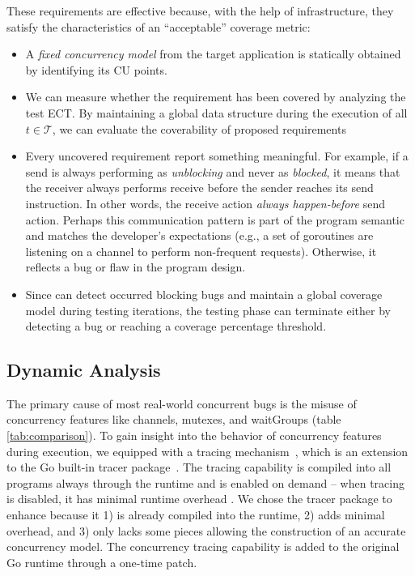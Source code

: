 These requirements are effective because, with the help of \goat infrastructure, they satisfy the characteristics of an ``acceptable'' coverage metric:
\begin{itemize}
  \item A \textit{fixed concurrency model} from the target application is statically obtained by identifying its CU points.
  \item We can measure whether the requirement has been covered by analyzing the test ECT. By maintaining a global data structure during the execution of all $t \in \mathcal{T}$, we can evaluate the coverability of proposed requirements
  \item Every uncovered requirement report something meaningful. For example, if a send is always performing as \textit{unblocking} and never as \textit{blocked}, it means that the receiver always performs receive before the sender reaches its send instruction. In other words, the receive action \textit{always happen-before} send action. Perhaps this communication pattern is part of the program semantic and matches the developer's expectations (e.g., a set of goroutines are listening on a channel to perform non-frequent requests). Otherwise, it reflects a bug or flaw in the program design.
  \item Since \goat can detect occurred blocking bugs and maintain a global coverage model during testing iterations, the testing phase can terminate either by detecting a bug or reaching a coverage percentage threshold.
\end{itemize}


\subsection{Dynamic Analysis}
\label{sec:dynamic_analysis}
The primary cause of most real-world concurrent bugs is the misuse of concurrency features like channels, mutexes, and waitGroups (table \ref{tab:comparison}).
%
To gain insight into the behavior of concurrency features during execution, we equipped \goat with a tracing mechanism~\cite{ect-arxiv}, which is an extension to the Go built-in tracer package~\cite{go-cmd-trace}.
%
The tracing capability is compiled into all programs always through the runtime and is enabled on demand -- when tracing is disabled, it has minimal runtime overhead \cite{go-exec-tracer-doc}.
%
We chose the tracer package to enhance because it 1) is already compiled into the runtime, 2) adds minimal overhead, and 3) only lacks some pieces allowing the construction of an accurate concurrency model.
%
The concurrency tracing capability is added to the original Go runtime through a one-time patch.

